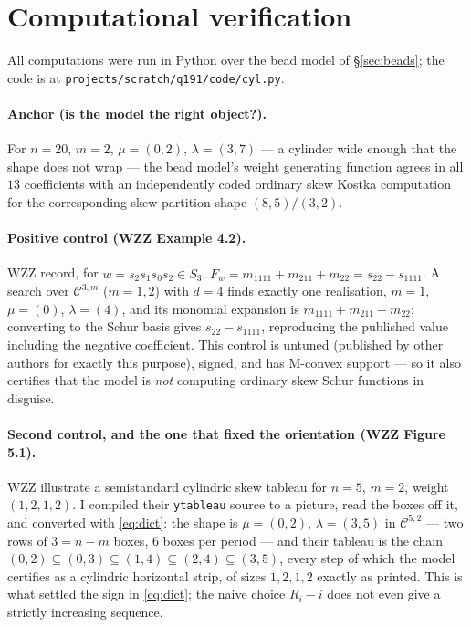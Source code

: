 \documentclass[11pt]{article}
\theoremstyle{plain}
\theoremstyle{definition}
\newcommand{\cyl}{\mathcal{C}}
\begin{document}
\section{Computational verification}\label{sec:verification}

All computations were run in Python over the bead model of \S\ref{sec:beads}; the code is at
\texttt{projects/scratch/q191/code/cyl.py}.

\paragraph{Anchor (is the model the right object?).}
For $n=20$, $m=2$, $\mu=(0,2)$, $\lambda=(3,7)$ --- a cylinder wide enough that the shape does
not wrap --- the bead model's weight generating function agrees in all $13$ coefficients with
an independently coded ordinary skew Kostka computation for the corresponding skew partition
shape $(8,5)/(3,2)$.

\paragraph{Positive control (WZZ Example 4.2).}
WZZ record, for $w=s_2s_1s_0s_2\in\widetilde{S}_3$,
$\widetilde{F}_{w}=m_{1111}+m_{211}+m_{22}=s_{22}-s_{1111}$. A search over $\cyl^{3,m}$
($m=1,2$) with $d=4$ finds exactly one realisation, $m=1$, $\mu=(0)$, $\lambda=(4)$, and its
monomial expansion is $m_{1111}+m_{211}+m_{22}$; converting to the Schur basis gives
$s_{22}-s_{1111}$, reproducing the published value including the negative coefficient. This
control is untuned (published by other authors for exactly this purpose), signed, and has
M-convex support --- so it also certifies that the model is \emph{not} computing ordinary skew
Schur functions in disguise.

\paragraph{Second control, and the one that fixed the orientation (WZZ Figure 5.1).}
WZZ illustrate a semistandard cylindric skew tableau for $n=5$, $m=2$, weight $(1,2,1,2)$. I
compiled their \texttt{ytableau} source to a picture, read the boxes off it, and converted with
\eqref{eq:dict}: the shape is $\mu=(0,2)$, $\lambda=(3,5)$ in $\cyl^{5,2}$ --- two rows of
$3=n-m$ boxes, $6$ boxes per period --- and their tableau is the chain
$(0,2)\subseteq(0,3)\subseteq(1,4)\subseteq(2,4)\subseteq(3,5)$, every step of which the model
certifies as a cylindric horizontal strip, of sizes $1,2,1,2$ exactly as printed. This is what
settled the sign in \eqref{eq:dict}; the naive choice $R_i-i$ does not even give a strictly
increasing sequence.
\end{document}
